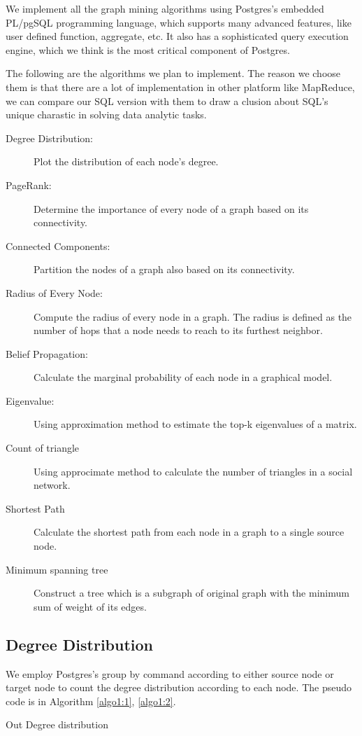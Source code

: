 We implement all the graph mining algorithms using Postgres's embedded PL/pgSQL programming language, which supports many advanced features, like user defined function, aggregate, etc. It also has a sophisticated query execution engine, which we think is the most critical component of Postgres.

The following are the algorithms we plan to implement. The reason we choose them is that there are a lot of implementation in other platform like MapReduce, we can compare our SQL version with them to draw a clusion about SQL's unique charastic in solving data analytic tasks.

\begin{description}
  \item[Degree Distribution:] Plot the distribution of each node's degree. 
  \item[PageRank:] Determine the importance of every node of a graph based on its connectivity. 
  \item[Connected Components:] Partition the nodes of a graph also based on its connectivity.
  \item[Radius of Every Node:] Compute the radius of every node in a graph. The radius is defined as the number of hops that a node needs to reach to its furthest neighbor.
  \item[Belief Propagation:] Calculate the marginal probability of each node in a graphical model. 
  \item[Eigenvalue:] Using approximation method to estimate the top-k eigenvalues of a matrix.
  \item[Count of triangle] Using approcimate method to calculate the number of triangles in a social network.
  \item[Shortest Path] Calculate the shortest path from each node in a graph to a single source node. 
  \item[Minimum spanning tree] Construct a tree which is a subgraph of original graph with the minimum sum of weight of its edges. 
\end{description}

\subsection{Degree Distribution}
We employ Postgres's group by command according to either source node or target node to count the degree distribution according to each node. The pseudo code is in Algorithm \ref{algo1:1}, \ref{algo1:2}.

\begin{algorithm}[!htbf]
\caption{Out Degree distribution}
\begin{algorithmic}
\end{algorithmic}
\label{algo1:1}
\end{algorithm}

